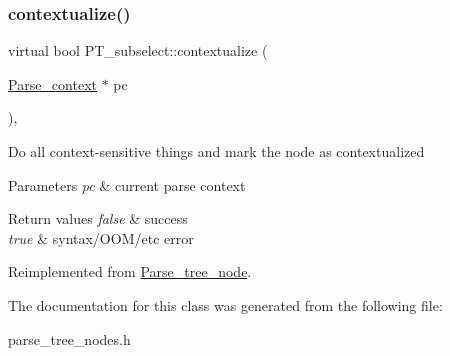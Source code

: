 \subsubsection{\texorpdfstring{contextualize()}{contextualize()}}
{\footnotesize\ttfamily virtual bool P\+T\+\_\+subselect\+::contextualize (\begin{DoxyParamCaption}\item[{\mbox{\hyperlink{structParse__context}{Parse\+\_\+context}} $\ast$}]{pc }\end{DoxyParamCaption})\hspace{0.3cm}{\ttfamily [inline]}, {\ttfamily [virtual]}}

Do all context-\/sensitive things and mark the node as contextualized


\begin{DoxyParams}{Parameters}
{\em pc} & current parse context\\
\hline
\end{DoxyParams}

\begin{DoxyRetVals}{Return values}
{\em false} & success \\
\hline
{\em true} & syntax/\+O\+O\+M/etc error \\
\hline
\end{DoxyRetVals}


Reimplemented from \mbox{\hyperlink{classParse__tree__node_a22d93524a537d0df652d7efa144f23da}{Parse\+\_\+tree\+\_\+node}}.



The documentation for this class was generated from the following file\+:\begin{DoxyCompactItemize}
\item 
parse\+\_\+tree\+\_\+nodes.\+h\end{DoxyCompactItemize}
